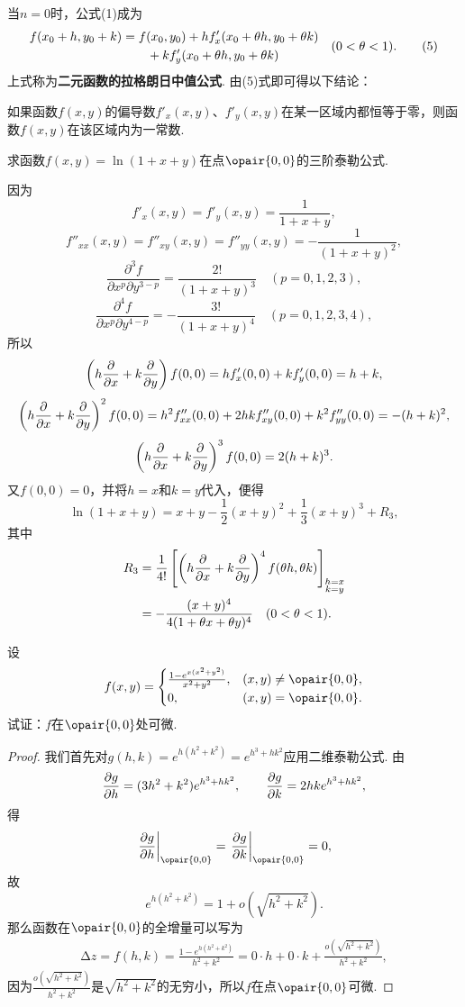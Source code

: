 当\(n=0\)时，公式(1)成为\begin{gather}
\label{equation:多元函数微分法.二元函数的拉格朗日中值公式}
\begin{split}
f(x_0+h,y_0+k)
&=f(x_0,y_0)
+h f'_x(x_0+\theta h,y_0+\theta k) \\
&\hspace{20pt}+k f'_y(x_0+\theta h,y_0+\theta k)
\end{split}
\quad(0<\theta<1).
\tag5
\end{gather}上式称为\textbf{二元函数的拉格朗日中值公式}.
由(5)式即可得以下结论：

如果函数\(f(x,y)\)的偏导数\(f'_x(x,y)\)、\(f'_y(x,y)\)在某一区域内都恒等于零，则函数\(f(x,y)\)在该区域内为一常数.

\begin{example}
求函数\(f(x,y) = \ln(1+x+y)\)在点\(\opair{0,0}\)的三阶泰勒公式.
\begin{solution}
\def\oprt#1{\left(h\pdv{x}+k\pdv{y}\right)\ifx\relax#1\relax\else^{#1}\fi}
因为\[
f'_x(x,y) = f'_y(x,y) = \frac{1}{1+x+y},
\]\[
f''_{xx}(x,y) = f''_{xy}(x,y) = f''_{yy}(x,y) = -\frac{1}{(1+x+y)^2},
\]\[
\frac{\partial^3 f}{\partial x^p \partial y^{3-p}}
= \frac{2!}{(1+x+y)^3}
\quad(p=0,1,2,3),
\]\[
\frac{\partial^4 f}{\partial x^p \partial y^{4-p}}
= -\frac{3!}{(1+x+y)^4}
\quad(p=0,1,2,3,4),
\]所以\[
\oprt{} f(0,0) = h f'_x(0,0) + k f'_y(0,0) = h+k,
\]\[
\oprt{2} f(0,0) = h^2 f''_{xx}(0,0) + 2hk f''_{xy}(0,0) + k^2 f''_{yy}(0,0) = -(h+k)^2,
\]\[
\oprt{3} f(0,0) = 2(h+k)^3.
\]又\(f(0,0)=0\)，并将\(h=x\)和\(k=y\)代入，便得\[
\ln(1+x+y) = x+y-\frac{1}{2}(x+y)^2+\frac{1}{3}(x+y)^3+R_3,
\]其中\begin{align*}
R_3
&= \frac{1}{4!} \left[\oprt{4} f(\theta h,\theta k)\right]_{\substack{h=x\\k=y}} \\
&= -\frac{(x+y)^4}{4(1+\theta x+\theta y)^4}
\quad(0<\theta<1).
\end{align*}
\end{solution}
\end{example}

\begin{example}
\def\ev#1{\eval{#1}_{\opair{0,0}}}%
设\[
f(x,y) = \begin{cases}
\frac{1 - e^{x(x^2+y^2)}}{x^2+y^2}, & (x,y)\neq\opair{0,0}, \\
0, & (x,y)=\opair{0,0}.
\end{cases}
\]试证：\(f\)在\(\opair{0,0}\)处可微.
\begin{proof}
我们首先对\(g(h,k) = e^{h(h^2+k^2)} = e^{h^3+hk^2}\)应用二维泰勒公式.
由\[
\pdv{g}{h} = (3h^2+k^2)e^{h^3+hk^2}, \qquad
\pdv{g}{k} = 2hke^{h^3+hk^2},
\]得\[
\ev{\pdv{g}{h}} = \ev{\pdv{g}{k}} = 0,
\]故\[
e^{h(h^2+k^2)} = 1 + o(\sqrt{h^2+k^2}).
\]
那么函数在\(\opair{0,0}\)的全增量可以写为
\begin{align*}
\increment z = f(h,k) = \frac{1 - e^{h(h^2+k^2)}}{h^2+k^2}
= 0 \cdot h + 0 \cdot k + \frac{o(\sqrt{h^2+k^2})}{h^2+k^2},
\end{align*}
因为\(\frac{o(\sqrt{h^2+k^2})}{h^2+k^2}\)是\(\sqrt{h^2+k^2}\)的无穷小，所以\(f\)在点\(\opair{0,0}\)可微.
\end{proof}
\end{example}

